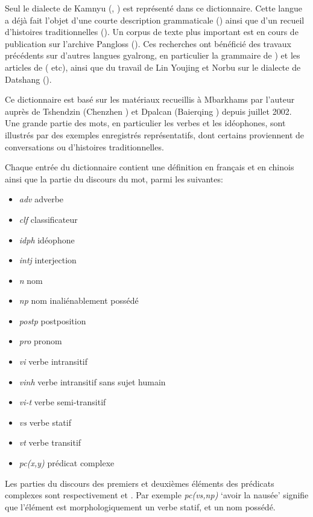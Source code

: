 Seul le dialecte de Kamnyu (, ) est représenté dans ce dictionnaire. Cette langue a déjà fait l'objet d'une courte description grammaticale (\citealt{jacques08}) ainsi que d'un recueil d'histoires traditionnelles (\citealt{jacques10gesar}). Un corpus de texte plus important est en cours de publication sur l'archive Pangloss (\citealt{michailovsky14pangloss}). Ces recherches ont bénéficié des travaux précédents sur d'autres langues gyalrong, en particulier la grammaire de \citet{linxr93jiarong}) et les articles de (\citealt{jackson00sidaba, jackson04zhuangmaoci, jackson06paisheng, jackson14morpho} etc), ainsi que du travail de Lin Youjing et Norbu sur le dialecte de Datshang (\citealt{linluo03}).

Ce dictionnaire est basé sur les matériaux recueillis à Mbarkhams par l'auteur auprès de Tshendzin (Chenzhen ) et Dpalcan (Baierqing ) depuis juillet 2002. Une grande partie des mots, en particulier les verbes et les idéophones, sont illustrés par des exemples enregistrés représentatifs, dont certains proviennent de conversations ou d'histoires traditionnelles.

Chaque entrée du dictionnaire contient une définition en français et en chinois ainsi que la partie du discours du mot, parmi les suivantes:

\begin{itemize}
\item \textit{adv} adverbe
\item \textit{clf} classificateur
\item \textit{idph} idéophone
\item \textit{intj} interjection
\item \textit{n} nom
\item \textit{np} nom inaliénablement possédé 
\item \textit{postp} postposition
\item \textit{pro} pronom
\item \textit{vi} verbe intransitif
\item \textit{vinh} verbe intransitif sans sujet humain
\item \textit{vi-t} verbe semi-transitif
\item \textit{vs} verbe statif
\item \textit{vt} verbe transitif
\item \textit{pc(x,y)} prédicat complexe 
\end{itemize}

Les parties du discours des premiers et deuxièmes éléments des prédicats complexes sont respectivement  et . Par exemple  \textit{pc(vs,np)} `avoir la nausée' signifie que l'élément  est morphologiquement un verbe statif, et  un nom possédé.

